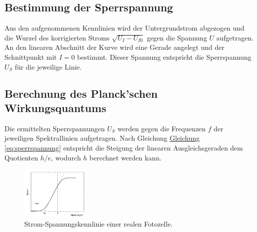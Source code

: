 \subsection{Bestimmung der Sperrspannung}

Aus den aufgenommenen Kennlinien wird der Untergrundstrom abgezogen und die Wurzel des korrigierten Stroms $\sqrt{U_I-U_{I0}}$ gegen die Spannung $U$ aufgetragen. An den linearen Abschnitt der Kurve wird eine Gerade angelegt und der Schnittpunkt mit $I=0$ bestimmt. Dieser Spannung entspricht die Sperrspannung $U_S$ für die jeweilige Linie.

\subsection{Berechnung des Planck'schen Wirkungsquantums}

Die ermittelten Sperrspannungen $U_S$ werden gegen die Frequenzen $f$ der jeweiligen Spektrallinien aufgetragen. Nach Gleichung \hyperref[eq:sperrspannung]{Gleichung \ref*{eq:sperrspannung}} entspricht die Steigung der linearen Ausgleichsgeraden dem Quotienten $h/e$, wodurch $h$ berechnet werden kann.

\begin{figure}[!ht]
    \centering
    \includegraphics[width=0.3\textwidth]{img/35/gr.png}
    \caption{Strom-Spannungskennlinie einer realen Fotozelle.}
    \label{fig:v}
\end{figure}
